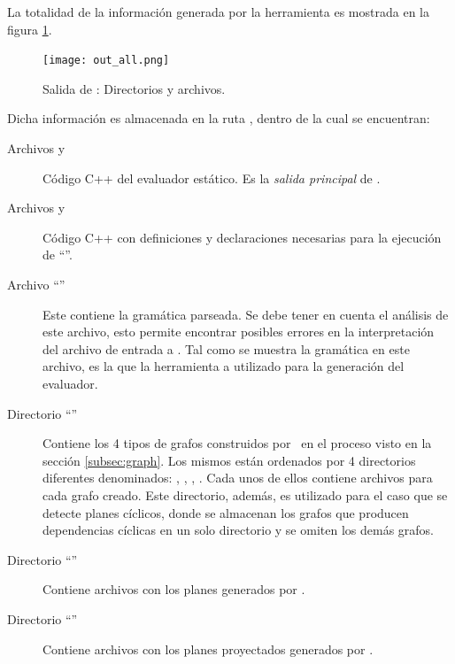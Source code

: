 \begin{center}{\scriptsize{}}\end{center}

La totalidad de la información generada por la herramienta es mostrada en la figura \ref{fig:outmaggen}.

\begin{figure}[!ht]\centering
\texttt{[image: out\_all.png]}
\caption{\label{fig:outmaggen} Salida de \maggen: Directorios y archivos.}
\end{figure}

Dicha información es almacenada en la ruta , dentro de la cual se encuentran:

\begin{description}
\item [Archivos  y ] Código C++ del evaluador estático. Es la \emph{salida principal} de \maggen.

\item [Archivos  y ] Código C++ con definiciones y declaraciones necesarias para la ejecución de ``\maggen''.

\item [Archivo ``''] Este contiene la gramática parseada. Se debe tener en cuenta el análisis de este archivo, esto permite encontrar posibles errores en la interpretación del archivo de entrada a \maggen. Tal como se muestra la gramática en este archivo, es la que la herramienta a utilizado para la generación del evaluador.

\item [Directorio ``''] Contiene los 4 tipos de grafos construidos por \maggen\ en el proceso visto en la sección \ref{subsec:graph}. Los mismos están ordenados por 4 directorios diferentes denominados: , , , . Cada unos de ellos contiene archivos  para cada grafo creado. Este directorio, además, es utilizado para el caso que se detecte planes cíclicos, donde se almacenan los grafos que producen dependencias cíclicas en un solo directorio y se omiten los demás grafos.

\item [Directorio ``''] Contiene archivos  con los planes generados por \maggen.

\item [Directorio ``''] Contiene archivos  con los planes proyectados generados por \maggen.
\end{description}

